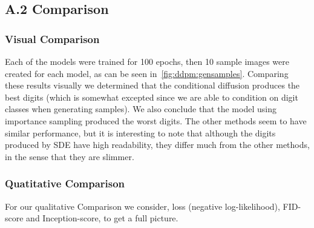 \subsection{A.2 Comparison}

\subsubsection{Visual Comparison}
Each of the models were trained for 100 epochs, then 10 sample images were created for each model, as can be seen in~\cref{fig:ddpm:gensamples}.
Comparing these results visually we determined that the conditional diffusion produces the best digits (which is somewhat excepted since we are able to condition on digit classes when generating samples).
We also conclude that the model using importance sampling produced the worst digits. 
The other methods seem to have similar performance, but it is interesting to note that although the digits produced by SDE have high readability, they differ much from the other methods, in the sense that they are slimmer.


\subsubsection{Quatitative Comparison}
For our qualitative Comparison we consider, loss (negative log-likelihood), FID-score and Inception-score, to get a full picture.

